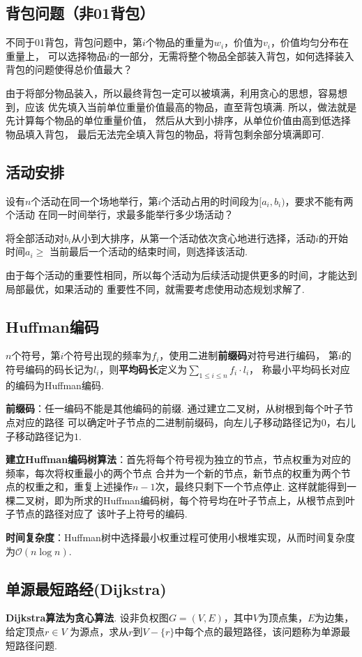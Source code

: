 \documentclass[12pt, a4paper, oneside]{ctexart}
\numberwithin{equation}{section}  %
\theoremstyle{definition}
\let\leq=\leqslant %
\let\geq=\geqslant %
\def\O{\mathcal{O}}         %
\begin{document}
\subsection{背包问题（非01背包）}
不同于01背包，背包问题中，第$i$个物品的重量为$w_i$，价值为$v_i$，价值均匀分布在重量上，
可以选择物品$i$的一部分，无需将整个物品全部装入背包，如何选择装入背包的问题使得总价值最大？

由于将部分物品装入，所以最终背包一定可以被填满，利用贪心的思想，容易想到，应该
优先填入当前单位重量价值最高的物品，直至背包填满. 所以，做法就是先计算每个物品的单位重量价值，
然后从大到小排序，从单位价值由高到低选择物品填入背包，
最后无法完全填入背包的物品，将背包剩余部分填满即可.
\subsection{活动安排}
设有$n$个活动在同一个场地举行，第$i$个活动占用的时间段为$[a_i,b_i)$，要求不能有两个活动
在同一时间举行，求最多能举行多少场活动？

将全部活动对$b_i$从小到大排序，从第一个活动依次贪心地进行选择，活动$i$的开始时间$a_i\geq $
当前最后一个活动的结束时间，则选择该活动.

由于每个活动的重要性相同，所以每个活动为后续活动提供更多的时间，才能达到局部最优，如果活动的
重要性不同，就需要考虑使用动态规划求解了.

\subsection{Huffman编码}
$n$个符号，第$i$个符号出现的频率为$f_i$，使用二进制\textbf{前缀码}对符号进行编码，
第$i$的符号编码的码长记为$l_i$，则\textbf{平均码长}定义为$\sum_{1\leq i\leq n}f_i\cdot l_i$，
称最小平均码长对应的编码为Huffman编码. 

\textbf{前缀码}：任一编码不能是其他编码的前缀. 通过建立二叉树，从树根到每个叶子节点对应的路径
可以确定叶子节点的二进制前缀码，向左儿子移动路径记为$0$，右儿子移动路径记为$1$.

\textbf{建立Huffman编码树算法}：首先将每个符号视为独立的节点，节点权重为对应的频率，每次将权重最小的两个节点
合并为一个新的节点，新节点的权重为两个节点的权重之和，重复上述操作$n-1$次，最终只剩下一个节点停止. 
这样就能得到一棵二叉树，即为所求的Huffman编码树，每个符号均在叶子节点上，从根节点到叶子节点的路径对应了
该叶子上符号的编码.

\textbf{时间复杂度}：Huffman树中选择最小权重过程可使用小根堆实现，从而时间复杂度为$\O(n\log n)$.

\subsection{单源最短路经(Dijkstra)}
\textbf{Dijkstra算法为贪心算法}. 设非负权图$G=(V,E)$，其中$V$为顶点集，$E$为边集，给定顶点$r\in V$
为源点，求从$r$到$V-\{r\}$中每个点的最短路径，该问题称为单源最短路径问题.
\end{document}
